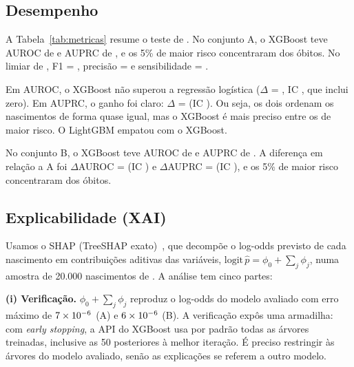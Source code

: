 \documentclass[12pt]{article}
\begin{document}
\begin{table}[!htbp]
\centering
\caption{Óbitos neonatais pareados $\times$ não pareados, pelas informações da Declaração de Óbito.}
\label{tab:vies}
\small
\tabVies
\end{table}

\subsection{Desempenho}

A Tabela~\ref{tab:metricas} resume o teste de \anoTeste{}. No conjunto A, o XGBoost teve AUROC de \AXgbAurocIC{} e AUPRC de \AXgbAuprcIC{}, e os 5\% de maior risco concentraram \AXgbTop{} dos óbitos. No limiar de \anoValid{}, F1 = \AXgbFum{}, precisão = \AXgbPrec{} e sensibilidade = \AXgbSens{}.

Em AUROC, o XGBoost não superou a regressão logística ($\Delta$ = \dXLa{}, IC \dXLaIC{}, que inclui zero). Em AUPRC, o ganho foi claro: $\Delta$ = \dXLaprc{} (IC \dXLaprcIC{}). Ou seja, os dois ordenam os nascimentos de forma quase igual, mas o XGBoost é mais preciso entre os de maior risco. O LightGBM empatou com o XGBoost.

No conjunto B, o XGBoost teve AUROC de \BXgbAurocIC{} e AUPRC de \BXgbAuprcIC{}. A diferença em relação a A foi $\Delta$AUROC = \dAB{} (IC \dABIC{}) e $\Delta$AUPRC = \dABprc{} (IC \dABprcIC{}), e os 5\% de maior risco concentraram \BXgbTop{} dos óbitos.

\begin{table}[!htbp]
\centering
\caption{Desempenho no teste de \anoTeste{} (IC 95\% por bootstrap). AUROC, AUPRC e top 5\% pelo escore bruto; F1, precisão e sensibilidade no limiar escolhido em \anoValid{}.}
\label{tab:metricas}
\small
\setlength{\tabcolsep}{4pt}
\tabMetricas
\end{table}

\subsection{Explicabilidade (XAI)}

Usamos o SHAP (TreeSHAP exato)~\cite{lundberg2017}, que decompõe o log-odds previsto de cada nascimento em contribuições aditivas das variáveis, $\mathrm{logit}\,\hat p = \phi_0 + \sum_j \phi_j$, numa amostra de 20.000 nascimentos de \anoTeste{}. A análise tem cinco partes:

\textbf{(i) Verificação.} $\phi_0 + \sum_j \phi_j$ reproduz o log-odds do modelo avaliado com erro máximo de $7\times 10^{-6}$ (A) e $6\times 10^{-6}$ (B). A verificação expôs uma armadilha: com \textit{early stopping}, a API do XGBoost usa por padrão todas as árvores treinadas, inclusive as 50 posteriores à melhor iteração. É preciso restringir às árvores do modelo avaliado, senão as explicações se referem a outro modelo.
\end{document}
